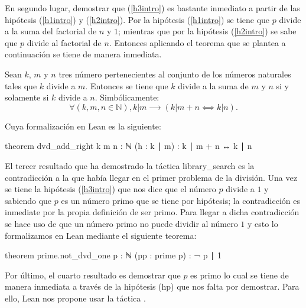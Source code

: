 En segundo lugar, demostrar que (\ref{h3intro}) es bastante inmediato a partir
de las hipótesis (\ref{h1intro}) y (\ref{h2intro}). Por la hipótesis
(\ref{h1intro}) se tiene que \(p\) divide a la suma del factorial de \(n\) y
\(1\); mientras que por la hipótesis (\ref{h2intro}) se sabe que \(p\) divide
al factorial de \(n\). Entonces aplicando el teorema que se plantea a
continuación se tiene de manera inmediata.
\begin{teorema}
  Sean \(k\), \(m\) y \(n\) tres número pertenecientes al conjunto de los
  números naturales tales que \(k\) divide a \(m\). Entonces se tiene que \(k\)
  divide a la suma de \(m\) y \(n\) si y solamente si \(k\) divide a \(n\).
  Simbólicamente:
  \begin{equation*}
    ∀(k,m,n∈ℕ), k|m ⟶ (k|m+n⟺k|n).
  \end{equation*}
\end{teorema}

Cuya formalización en Lean es la siguiente:
\begin{leancode}
theorem dvd_add_right {k m n : ℕ} (h : k ∣ m) : k ∣ m + n ↔ k ∣ n 
\end{leancode}

El tercer resultado que ha demostrado la táctica 
{library\_search} es la contradicción a la que había llegar en el primer
problema de la división. Una vez se tiene la hipótesis (\ref{h3intro}) que
nos dice que el número \(p\) divide a \(1\) y sabiendo que \(p\) es un número
primo que se tiene por hipótesis; la contradicción es inmediate por la propia
definición de ser primo. Para llegar a dicha contradicción se hace uso de que
un número primo no puede dividir al número \(1\) y esto lo formalizamos en Lean
mediante el siguiente teorema:
\begin{leancode}
theorem prime.not_dvd_one {p : ℕ} (pp : prime p) : ¬ p ∣ 1
\end{leancode}

Por último, el cuarto resultado es demostrar que \(p\) es primo lo cual se tiene
de manera inmediata a través de la hipótesis (hp) que nos falta por demostrar.
Para ello, Lean nos propone usar la táctica .

